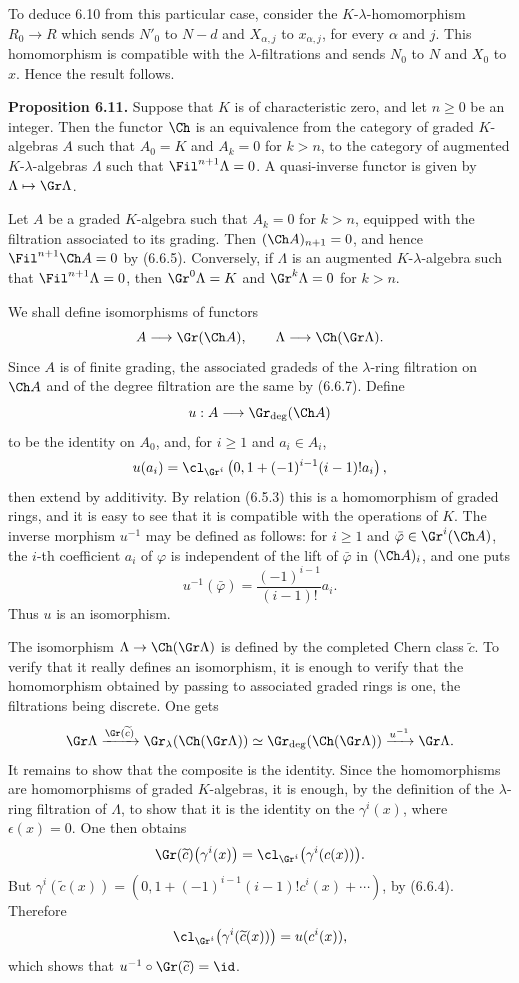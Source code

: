 To deduce 6.10 from this particular case, consider the \(K\)-\(\lambda\)-homomorphism \(R_0\to R\) which sends \(N'_0\) to \(N-d\) and \(X_{\alpha,j}\) to \(x_{\alpha,j}\), for every \(\alpha\) and \(j\). This homomorphism is compatible with the \(\lambda\)-filtrations and sends \(N_0\) to \(N\) and \(X_0\) to \(x\). Hence the result follows.

\textbf{Proposition 6.11.} Suppose that \(K\) is of characteristic zero, and let \(n\ge0\) be an integer. Then the functor \(\Ch\) is an equivalence from the category of graded \(K\)-algebras \(A\) such that \(A_0=K\) and \(A_k=0\) for \(k>n\), to the category of augmented \(K\)-\(\lambda\)-algebras \(\Lambda\) such that \(\Fil^{n+1}\Lambda=0\). A quasi-inverse functor is given by \(\Lambda\mapsto\Gr\Lambda\).

Let \(A\) be a graded \(K\)-algebra such that \(A_k=0\) for \(k>n\), equipped with the filtration associated to its grading. Then \((\Ch A)_{n+1}=0\), and hence \(\Fil^{n+1}\Ch A=0\) by (6.6.5). Conversely, if \(\Lambda\) is an augmented \(K\)-\(\lambda\)-algebra such that \(\Fil^{n+1}\Lambda=0\), then \(\Gr^0\Lambda=K\) and \(\Gr^k\Lambda=0\) for \(k>n\).

We shall define isomorphisms of functors
\[
  A\longrightarrow \Gr(\Ch A),
  \qquad
  \Lambda\longrightarrow\Ch(\Gr\Lambda).
\]
Since \(A\) is of finite grading, the associated gradeds of the \(\lambda\)-ring filtration on \(\Ch A\) and of the degree filtration are the same by (6.6.7). Define
\[
  u:A\longrightarrow \Gr_{\deg}(\Ch A)
\]
to be the identity on \(A_0\), and, for \(i\ge1\) and \(a_i\in A_i\),
\[
  u(a_i)=
  \cl_{\Gr^i}\left(0,1+(-1)^{i-1}(i-1)!a_i\right),
\]
then extend by additivity. By relation (6.5.3) this is a homomorphism of graded rings, and it is easy to see that it is compatible with the operations of \(K\). The inverse morphism \(u^{-1}\) may be defined as follows: for \(i\ge1\) and \(\bar\varphi\in\Gr^i(\Ch A)\), the \(i\)-th coefficient \(a_i\) of \(\varphi\) is independent of the lift of \(\bar\varphi\) in \((\Ch A)_i\), and one puts
\[
  u^{-1}(\bar\varphi)=\frac{(-1)^{i-1}}{(i-1)!}a_i.
\]
Thus \(u\) is an isomorphism.

The isomorphism \(\Lambda\to\Ch(\Gr\Lambda)\) is defined by the completed Chern class \(\widetilde c\). To verify that it really defines an isomorphism, it is enough to verify that the homomorphism obtained by passing to associated graded rings is one, the filtrations being discrete. One gets
\[
  \Gr\Lambda
   \xrightarrow{\Gr(\widetilde c)}
  \Gr_{\lambda}(\Ch(\Gr\Lambda))
   \simeq
  \Gr_{\deg}(\Ch(\Gr\Lambda))
   \xrightarrow{u^{-1}}
  \Gr\Lambda .
\]
It remains to show that the composite is the identity. Since the homomorphisms are homomorphisms of graded \(K\)-algebras, it is enough, by the definition of the \(\lambda\)-ring filtration of \(\Lambda\), to show that it is the identity on the \(\gamma^i(x)\), where \(\epsilon(x)=0\). One then obtains
\[
  \Gr(\widetilde c)\bigl(\gamma^i(x)\bigr)
  =
  \cl_{\Gr^i}\bigl(\gamma^i(c(x))\bigr).
\]
But \(\gamma^i(\widetilde c(x))=(0,1+(-1)^{i-1}(i-1)!c^i(x)+\cdots)\), by (6.6.4). Therefore
\[
  \cl_{\Gr^i}\bigl(\gamma^i(\widetilde c(x))\bigr)=u(c^i(x)),
\]
which shows that \(u^{-1}\circ\Gr(\widetilde c)=\id\).


